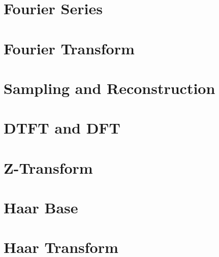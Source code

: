 
\makeindex



    

    \tableofcontents

    \chapter{Fourier Series}
	\label{ch:fs}

	
	
	
	
	
	
  

    \chapter{Fourier Transform}
    \label{ch:ft}
    
    
    
    
    
    
    
    
    

    \chapter{Sampling and Reconstruction}
    \label{ch:sr}
    
    
    
    
    
    
 
	\chapter{DTFT and DFT}
    \label{ch:dft}
    
    
    
    
    
    
    
    
    
	
	\chapter{Z-Transform}
    \label{ch:zt}
    
    
    
    
    
	
	\chapter{Haar Base}
    \label{ch:hb}
    

    \chapter{Haar Transform}
    \label{ch:ht}
	

    
    


